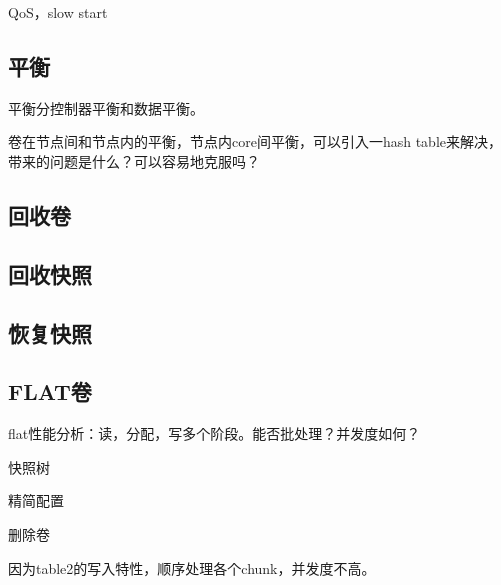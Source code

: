 QoS，slow start

\subsection{平衡}

平衡分控制器平衡和数据平衡。

卷在节点间和节点内的平衡，节点内core间平衡，可以引入一hash table来解决，
带来的问题是什么？可以容易地克服吗？

\subsection{回收卷}

\subsection{回收快照}

\subsection{恢复快照}

\subsection{FLAT卷}

flat性能分析：读，分配，写多个阶段。能否批处理？并发度如何？

快照树

精简配置

删除卷

因为table2的写入特性，顺序处理各个chunk，并发度不高。
